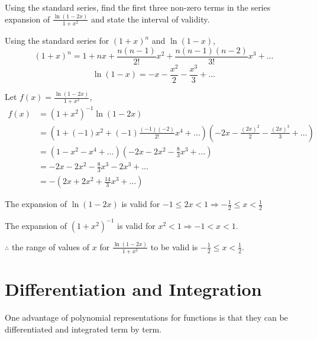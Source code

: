 \documentclass[11pt,a4paper]{book}
\begin{document}
\newpage

\begin{example}

Using the standard series, find the first three non-zero terms in
the series expansion of ${\displaystyle \frac{\ln\left(1-2x\right)}{1+x^{2}}}$
and state the interval of validity.

\Solution

Using the standard series for $\left(1+x\right)^{n}$ and $\ln\left(1-x\right)$,
\[
\left(1+x\right)^{n}=1+nx+\frac{n\left(n-1\right)}{2!}x^{2}+\frac{n\left(n-1\right)\left(n-2\right)}{3!}x^{3}+\ldots
\]
\[
\ln\left(1-x\right)=-x-\frac{x^{2}}{2}-\frac{x^{3}}{3}+\ldots
\]

Let $f\left(x\right)={\displaystyle {\displaystyle \frac{\ln\left(1-2x\right)}{1+x^{2}}}}$,
\begin{align*}
f\left(x\right) & ={\displaystyle \left(1+x^{2}\right)^{-1}}\ln\left(1-2x\right)\\
 & =\left(1+\left(-1\right)x^{2}+\left(-1\right)\frac{\left(-1\right)\left(-2\right)}{2!}x^{4}+\ldots\right)\left(-2x-\frac{\left(2x\right)^{2}}{2}-\frac{\left(2x\right)^{3}}{3}+\ldots\right)\\
 & =\left(1-x^{2}-x^{4}+\ldots\right)\left(-2x-2x^{2}-\frac{8}{3}x^{3}+\ldots\right)\\
 & =-2x-2x^{2}-\frac{8}{3}x^{3}-2x^{3}+\ldots\\
 & =-\left(2x+2x^{2}+\frac{14}{3}x^{3}+\ldots\right)
\end{align*}

The expansion of $\ln\left(1-2x\right)$ is valid for ${\displaystyle -1\leq2x<1\Rightarrow-\frac{1}{2}\leq x<\frac{1}{2}}$

The expansion of $\left(1+x^{2}\right)^{-1}$ is valid for $x^{2}<1\Rightarrow-1<x<1$.

$\therefore$ the range of values of $x$ for ${\displaystyle {\displaystyle \frac{\ln\left(1-2x\right)}{1+x^{2}}}}$
to be valid is ${\displaystyle -\frac{1}{2}\leq x<\frac{1}{2}}$.

\end{example}

\newpage

\section{Differentiation and Integration }

One advantage of polynomial representations for functions is that
they can be differentiated and integrated term by term.
\end{document}
